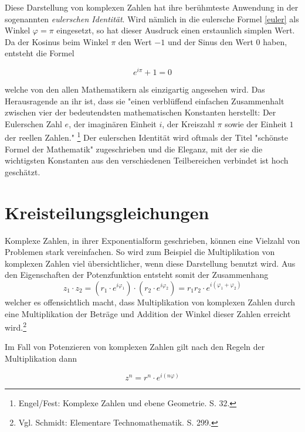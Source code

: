 \documentclass[a4paper,12pt]{article} %
\begin{document}
Diese Darstellung von komplexen Zahlen hat ihre berühmteste Anwendung in der sogenannten \emph{eulerschen Identität}.
Wird nämlich in die eulersche Formel \eqref{euler} als Winkel $\varphi=\pi$ eingesetzt, so hat dieser Ausdruck einen erstaunlich simplen Wert.
Da der Kosinus beim Winkel $\pi$ den Wert $-1$ und der Sinus den Wert $0$ haben, entsteht die Formel

\begin{equation}
	\boxed{e^{i\pi}+1=0}
\end{equation}

\noindent welche von den allen Mathematikern als einzigartig angesehen wird.
Das Herausragende an ihr ist, dass sie "{}einen verblüffend einfachen Zusammenhalt zwischen vier der bedeutendsten mathematischen Konstanten herstellt:
Der Eulerschen Zahl $e$, der imaginären Einheit $i$, der Kreiszahl $\pi$ sowie der Einheit $1$ der reellen Zahlen."
\footnote{Engel/Fest: Komplexe Zahlen und ebene Geometrie. S. $32$.}
Der eulerschen Identität wird oftmals der Titel "{}schönste Formel der Mathematik"{} zugeschrieben und die Eleganz, mit der sie die wichtigsten Konstanten aus den verschiedenen Teilbereichen verbindet ist hoch geschätzt.\\



\section{Kreisteilungsgleichungen}



Komplexe Zahlen, in ihrer Exponentialform geschrieben, können eine Vielzahl von Problemen stark vereinfachen.
So wird zum Beispiel die Multiplikation von komplexen Zahlen viel übersichtlicher, wenn diese Darstellung benutzt wird.
Aus den Eigenschaften der Potenzfunktion entsteht somit der Zusammenhang
\[z_1\cdot z_2=(r_1 \cdot e^{i\varphi_1}) \cdot (r_2 \cdot e^{i\varphi_2})=r_1 r_2 \cdot e^{i(\varphi_1+\varphi_2)}\]
welcher es offensichtlich macht, dass Multiplikation von komplexen Zahlen durch eine Multiplikation der Beträge und Addition der Winkel dieser Zahlen erreicht wird.\footnote{Vgl. Schmidt: Elementare Technomathematik. S. 299.}

Im Fall von Potenzieren von komplexen Zahlen gilt nach den Regeln der Multiplikation dann

\begin{equation}\label{potenz}
	z^n=r^n \cdot e^{i(n\varphi)}
\end{equation}
\end{document}
